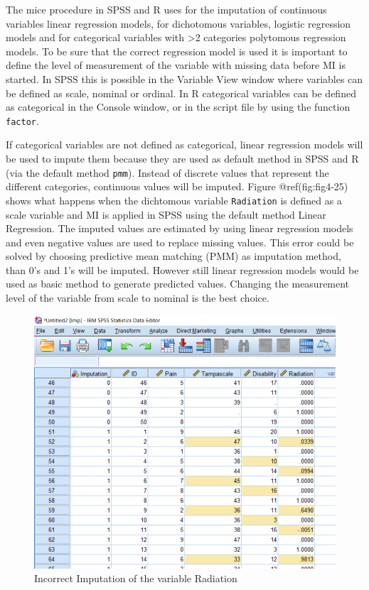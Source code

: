 \documentclass[
]{book}
\begin{document}
The mice procedure in SPSS and R uses for the imputation of continuous
variables linear regression models, for dichotomous variables, logistic
regression models and for categorical variables with \textgreater2
categories polytomous regression models. To be sure that the correct
regression model is used it is important to define the level of
measurement of the variable with missing data before MI is started. In
SPSS this is possible in the Variable View window where variables can be
defined as scale, nominal or ordinal. In R categorical variables can be
defined as categorical in the Console window, or in the script file by
using the function \texttt{factor}.

If categorical variables are not defined as categorical, linear
regression models will be used to impute them because they are used as
default method in SPSS and R (via the default method \texttt{pmm}).
Instead of discrete values that represent the different categories,
continuous values will be imputed. Figure @ref(fig:fig4-25) shows what
happens when the dichtomous variable \texttt{Radiation} is defined as a
scale variable and MI is applied in SPSS using the default method Linear
Regression. The imputed values are estimated by using linear regression
models and even negative values are used to replace missing values. This
error could be solved by choosing predictive mean matching (PMM) as
imputation method, than 0's and 1's will be imputed. However still
linear regression models would be used as basic method to generate
predicted values. Changing the measurement level of the variable from
scale to nominal is the best choice.

\begin{figure}

{\centering \includegraphics[width=0.9\linewidth]{images/fig4.25} 

}

\caption{Incorrect Imputation of the variable Radiation}\label{fig:fig4-25}
\end{figure}
\end{document}
